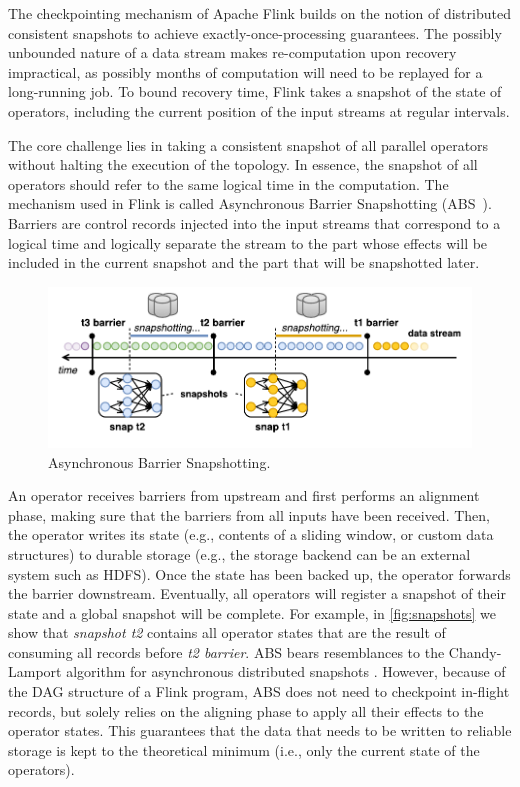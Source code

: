 \documentclass[11pt]{article}
\begin{document}
The checkpointing mechanism of Apache Flink builds on the notion of distributed consistent snapshots to achieve exactly-once-processing guarantees. The possibly unbounded nature of a data stream makes re-computation upon recovery impractical, as possibly months of computation will need to be replayed for a long-running job. To bound recovery time, Flink takes a snapshot of the state of operators, including the current position of the input streams at regular intervals.

The core challenge lies in taking a consistent snapshot of all parallel operators without halting the execution of the topology. In essence, the snapshot of all operators should refer to the same logical time in the computation. The mechanism used in Flink is called Asynchronous Barrier Snapshotting (ABS~\cite{carbone2015lightweight}). Barriers are control records injected into the input streams that correspond to a logical time and logically separate the stream to the part whose effects will be included in the current snapshot and the part that will be snapshotted later.

\begin{figure}[t!]
	\centering
  	\includegraphics[width=.75\textwidth,natheight=419,natwidth=159]{figs/snaps.pdf}
  	\vspace{-6mm}
	\caption{Asynchronous Barrier Snapshotting.}
	\vspace{-2mm}
	\label{fig:snapshots}
\end{figure}

An operator receives barriers from upstream and first performs an alignment phase, making sure that the barriers from all inputs have been received. Then, the operator writes its state (e.g., contents of a sliding window, or custom data structures) to durable storage (e.g., the storage backend can be an external system such as HDFS). Once the state has been backed up, the operator forwards the barrier downstream. Eventually, all operators will register a snapshot of their state and a global snapshot will be complete. For example, in \autoref{fig:snapshots} we show that \emph{snapshot t2} contains all operator states that are the result of consuming all records before \emph{t2 barrier}. ABS bears resemblances to the Chandy-Lamport algorithm for asynchronous distributed snapshots \cite{chandy1985distributed}. However, because of the DAG structure of a Flink program, ABS does not need to checkpoint in-flight records, but solely relies on the aligning phase to apply all their effects to the operator states. This guarantees that the data that needs to be written to reliable storage is kept to the theoretical minimum (i.e., only the current state of the operators).
\end{document}
